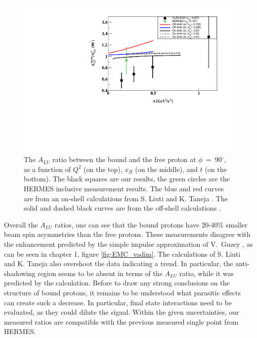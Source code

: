 \begin{figure}[tp]
\includegraphics[scale=0.52]{fig_Dec2016/ALU_ratioInc_t_shortscenrario.pdf}
\caption{ The $A_{LU}$ ratio between the bound and the free proton at 
   $\phi$~=~90$^{\circ}$, as a function of $Q^2$ (on the top), $x_B$ (on the 
   middle), and $t$ (on the bottom). The black squares are our results, the 
   green circles are the HERMES inclusive measurement \cite{HERMES_BSA} 
   results.  The blue and red curves are from an on-shell calculations from S.  
Liuti and K. Taneja \cite{simonetta_2}. The solid and dashed black curves are 
from the off-shell calculations \cite{EMC_vadim_2}.} 
\label{fig:incoh_EMC_ratio_ALU_proton}
\end{figure}

Overall the $A_{LU}$ ratios, one can see that the bound protons 
have 20-40$\%$ smaller beam spin asymmetries than the free protons. These measurements 
disagree with the enhancement predicted by the simple impulse approximation of 
V.~Guzey \cite{EMC_vadim_2}, as can be seen in chapter 1, figure 
\ref{fig:EMC_vadim}. The calculations of S. Liuti and K. Taneja \cite{simonetta_2}
also overshoot the data indicating a trend. In particular, the 
anti-shadowing region seems to be absent in terms of the $A_{LU}$ ratio, while
it was predicted by the calculation. Before to draw any strong conclusions on the 
structure of bound protons, it remains to be understood what parasitic
effects can create such a decrease. In particular, final state interactions need
to be evaluated, as they could dilute the signal.  Within the given 
uncertainties, our measured ratios are compatible with the previous measured 
single point from HERMES.


